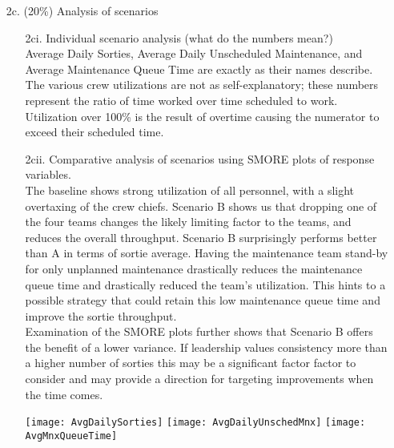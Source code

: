 \documentclass[answers]{exam}
\begin{document}
\begin{questions}
\begin{enumerate}
\begin{solution}
	\end{solution}
	\item[2c.] (20\%) Analysis of scenarios \\
	\begin{solution} 
	\begin{enumerate}
		\item[2ci.] Individual scenario analysis (what do the numbers mean?)\\
			Average Daily Sorties, Average Daily Unscheduled Maintenance, and Average Maintenance Queue Time
			are exactly as their names describe.
			The various crew utilizations are not as self-explanatory; 
			these numbers represent the ratio of time worked over
			time scheduled to work.
			Utilization over 100\% is the result of overtime causing the numerator
			to exceed their scheduled time. \\
		
		\item[2cii.] Comparative analysis of scenarios using SMORE plots of response variables.\\
			The baseline shows strong utilization of all personnel, 
			with a slight overtaxing of the crew chiefs.
			Scenario B shows us that dropping one of the four teams
			changes the likely limiting factor to the teams, and reduces the overall throughput.
			Scenario B surprisingly performs better than A in terms of sortie average.
			Having the maintenance team stand-by for only unplanned maintenance drastically 
			reduces the maintenance queue time and drastically reduced the team's utilization.
			This hints to a possible strategy that could retain this low maintenance
			queue time and improve the sortie throughput. \\
			
			Examination of the SMORE plots further shows that Scenario B
			offers the benefit of a lower variance.
			If leadership values consistency more than a higher number of
			sorties this may be a significant factor factor to consider
			and may provide a direction for targeting improvements
			when the time comes. \\
			
			\begin{center}
				\texttt{[image: AvgDailySorties]} \bigskip
				\texttt{[image: AvgDailyUnschedMnx]} \bigskip
				\texttt{[image: AvgMnxQueueTime]}
			\end{center}
		

\end{enumerate}
\end{solution}
\end{enumerate}
\end{questions}
\end{document}

